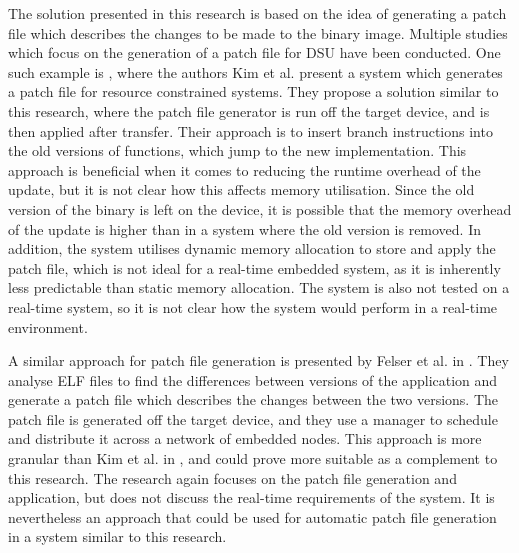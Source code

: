 The solution presented in this research is based on the idea of generating a patch file which describes the changes to be made to the binary image. Multiple studies which focus on the generation of a patch file for DSU have been conducted. One such example is \cite{dsuEnhancer}, where the authors Kim et al. present a system which generates a patch file for resource constrained systems. They propose a solution similar to this research, where the patch file generator is run off the target device, and is then applied after transfer. Their approach is to insert branch instructions into the old versions of functions, which jump to the new implementation. This approach is beneficial when it comes to reducing the runtime overhead of the update, but it is not clear how this affects memory utilisation. Since the old version of the binary is left on the device, it is possible that the memory overhead of the update is higher than in a system where the old version is removed. In addition, the system utilises dynamic memory allocation to store and apply the patch file, which is not ideal for a real-time embedded system, as it is inherently less predictable than static memory allocation. The system is also not tested on a real-time system, so it is not clear how the system would perform in a real-time environment.

A similar approach for patch file generation is presented by Felser et al. in \cite{resourceConstrained}. They analyse ELF files to find the differences between versions of the application and generate a patch file which describes the changes between the two versions. The patch file is generated off the target device, and they use a manager to schedule and distribute it across a network of embedded nodes. This approach is more granular than Kim et al. in \cite{dsuEnhancer}, and could prove more suitable as a complement to this research. The research again focuses on the patch file generation and application, but does not discuss the real-time requirements of the system. It is nevertheless an approach that could be used for automatic patch file generation in a system similar to this research.
